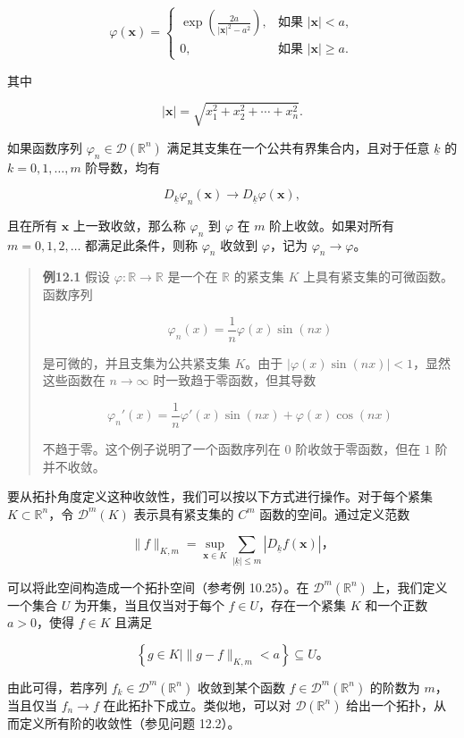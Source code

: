 \[
\varphi(\mathbf{x}) =
\begin{cases}
\exp\left(\frac{2a}{|\mathbf{x}|^2 - a^2}\right), & \text{如果 } |\mathbf{x}| < a, \\
0, & \text{如果 } |\mathbf{x}| \geq a.
\end{cases}
\]

其中

\[
|\mathbf{x}| = \sqrt{x_1^2 + x_2^2 + \cdots + x_n^2}.
\]

如果函数序列 \(\varphi_n \in \mathcal{D}(\mathbb{R}^n)\)
满足其支集在一个公共有界集合内，且对于任意 \(\underline{k}\) 的
\(k=0, 1, \ldots, m\) 阶导数，均有

\[
D_{\underline{k}} \varphi_n(\mathbf{x}) \to D_{\underline{k}} \varphi(\mathbf{x}),
\]

且在所有 \(\mathbf{x}\) 上一致收敛，那么称 \(\varphi_n\) 到 \(\varphi\)
在 \(m\) 阶上收敛。如果对所有 \(m=0,1,2,\ldots\) 都满足此条件，则称
\(\varphi_n\) 收敛到 \(\varphi\)，记为 \(\varphi_n \to \varphi\)。

\begin{quote}
\textbf{例12.1} 假设 \(\varphi: \mathbb{R} \to \mathbb{R}\) 是一个在
\(\mathbb{R}\) 的紧支集 \(K\) 上具有紧支集的可微函数。函数序列

\[
\varphi_n(x) = \frac{1}{n} \varphi(x) \sin(nx)
\]

是可微的，并且支集为公共紧支集 \(K\)。由于
\(|\varphi(x) \sin(nx)| < 1\)，显然这些函数在 \(n \to \infty\)
时一致趋于零函数，但其导数

\[
\varphi_n'(x) = \frac{1}{n} \varphi'(x) \sin(nx) + \varphi(x) \cos(nx)
\]

不趋于零。这个例子说明了一个函数序列在 \(0\) 阶收敛于零函数，但在 \(1\)
阶并不收敛。
\end{quote}

要从拓扑角度定义这种收敛性，我们可以按以下方式进行操作。对于每个紧集
\(K \subset \mathbb{R}^n\)，令 \(\mathcal{D}^m(K)\) 表示具有紧支集的
\(C^m\) 函数的空间。通过定义范数

\[
\|f\|_{K, m} = \sup_{\mathbf{x} \in K} \sum_{\mid \underline{k} \mid \leq m}\left|D_{\underline{k}} f(\mathbf{x})\right|，
\]

可以将此空间构造成一个拓扑空间（参考例 10.25）。在
\(\mathcal{D}^m(\mathbb{R}^n)\) 上，我们定义一个集合 \(U\)
为开集，当且仅当对于每个 \(f \in U\)，存在一个紧集 \(K\) 和一个正数
\(a > 0\)，使得 \(f \in K\) 且满足

\[
\left\{g \in K \mid \|g - f\|_{K, m} < a\right\} \subseteq U。
\]

由此可得，若序列 \(f_k \in \mathcal{D}^m(\mathbb{R}^n)\) 收敛到某个函数
\(f \in \mathcal{D}^m(\mathbb{R}^n)\) 的阶数为 \(m\)，当且仅当
\(f_n \to f\) 在此拓扑下成立。类似地，可以对
\(\mathcal{D}(\mathbb{R}^n)\)
给出一个拓扑，从而定义所有阶的收敛性（参见问题 12.2）。

